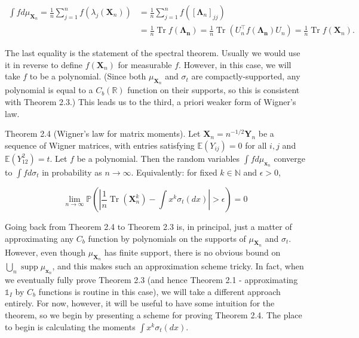 \documentclass[10pt]{article}
\begin{document}
$$
\begin{aligned}
\int f d \mu_{\mathbf{X}_{n}}=\frac{1}{n} \sum_{j=1}^{n} f\left(\lambda_{j}\left(\mathbf{X}_{n}\right)\right) & =\frac{1}{n} \sum_{j=1}^{n} f\left(\left[\boldsymbol{\Lambda}_{n}\right]_{j j}\right) \\
& =\frac{1}{n} \operatorname{Tr} f\left(\boldsymbol{\Lambda}_{\mathbf{n}}\right)=\frac{1}{n} \operatorname{Tr}\left(U_{n}^{\top} f\left(\boldsymbol{\Lambda}_{\mathbf{n}}\right) U_{n}\right)=\frac{1}{n} \operatorname{Tr} f\left(\mathbf{X}_{n}\right) .
\end{aligned}
$$

The last equality is the statement of the spectral theorem. Usually we would use it in reverse to define $f\left(\mathbf{X}_{n}\right)$ for measurable $f$. However, in this case, we will take $f$ to be a polynomial. (Since both $\mu_{\mathbf{X}_{n}}$ and $\sigma_{t}$ are compactly-supported, any polynomial is equal to a $C_{b}(\mathbb{R})$ function on their supports, so this is consistent with Theorem 2.3.) This leads us to the third, a priori weaker form of Wigner's law.

Theorem 2.4 (Wigner's law for matrix moments). Let $\mathbf{X}_{n}=n^{-1 / 2} \mathbf{Y}_{n}$ be a sequence of Wigner matrices, with entries satisfying $\mathbb{E}\left(Y_{i j}\right)=0$ for all $i, j$ and $\mathbb{E}\left(Y_{12}^{2}\right)=t$. Let $f$ be a polynomial. Then the random variables $\int f d \mu_{\mathbf{x}_{n}}$ converge to $\int f d \sigma_{t}$ in probability as $n \rightarrow \infty$. Equivalently: for fixed $k \in \mathbb{N}$ and $\epsilon>0$,

$$
\lim _{n \rightarrow \infty} \mathbb{P}\left(\left|\frac{1}{n} \operatorname{Tr}\left(\mathbf{X}_{n}^{k}\right)-\int x^{k} \sigma_{t}(d x)\right|>\epsilon\right)=0
$$

Going back from Theorem 2.4 to Theorem 2.3 is, in principal, just a matter of approximating any $C_{b}$ function by polynomials on the supports of $\mu_{\mathbf{X}_{n}}$ and $\sigma_{t}$. However, even though $\mu_{\mathbf{X}_{n}}$ has finite support, there is no obvious bound on $\bigcup_{n} \operatorname{supp} \mu_{\mathbf{x}_{n}}$, and this makes such an approximation scheme tricky. In fact, when we eventually fully prove Theorem 2.3 (and hence Theorem 2.1 - approximating $\mathbb{1}_{I}$ by $C_{b}$ functions is routine in this case), we will take a different approach entirely. For now, however, it will be useful to have some intuition for the theorem, so we begin by presenting a scheme for proving Theorem 2.4. The place to begin is calculating the moments $\int x^{k} \sigma_{t}(d x)$.
\end{document}
